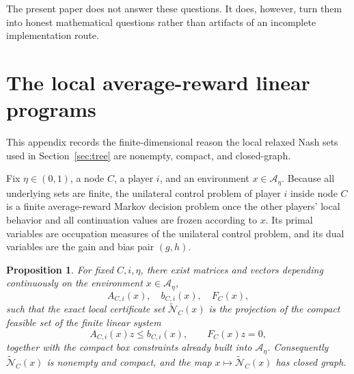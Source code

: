 \documentclass[12pt]{article}
\newtheorem{proposition}[theorem]{Proposition}
\theoremstyle{definition}
\newcommand{\1}{\mathbf{1}}
\newcommand{\cA}{\mathcal{A}}
\newcommand{\cN}{\mathcal{N}}
\begin{document}
The present paper does not answer these questions.  It does, however, turn them into
honest mathematical questions rather than artifacts of an incomplete implementation route.

\appendix

\section{The local average-reward linear programs}
\label{app:local-LP}

This appendix records the finite-dimensional reason the local relaxed Nash sets used in
Section~\ref{sec:tree} are nonempty, compact, and closed-graph.

Fix \(\eta\in(0,1)\), a node \(C\), a player \(i\), and an environment \(x\in \cA_\eta\).
Because all underlying sets are finite, the unilateral control problem of player \(i\)
inside node \(C\) is a finite average-reward Markov decision problem once the other
players' local behavior and all continuation values are frozen according to \(x\).  Its
primal variables are occupation measures of the unilateral control problem, and its dual
variables are the gain and bias pair \((g,h)\).

\begin{proposition}
\label{prop:local-LP}
For fixed \(C,i,\eta\), there exist matrices and vectors depending continuously on the
environment \(x\in\cA_\eta\),
\[
A_{C,i}(x),\quad b_{C,i}(x),\quad F_C(x),
\]
such that the exact local certificate set \(\widetilde{\cN}_C(x)\) is the projection of
the compact feasible set of the finite linear system
\[
A_{C,i}(x)z\le b_{C,i}(x),
\qquad
F_C(x)z=0,
\]
together with the compact box constraints already built into \(\cA_\eta\).
Consequently \(\widetilde{\cN}_C(x)\) is nonempty and compact, and the map
\(x\mapsto \widetilde{\cN}_C(x)\) has closed graph.
\end{proposition}
\end{document}

